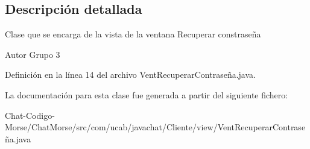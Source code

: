 \subsection{Descripción detallada}
Clase que se encarga de la vista de la ventana Recuperar constraseña \begin{DoxyAuthor}{Autor}
Grupo 3 
\end{DoxyAuthor}


Definición en la línea 14 del archivo Vent\-Recuperar\-Contraseña.\-java.



La documentación para esta clase fue generada a partir del siguiente fichero\-:\begin{DoxyCompactItemize}
\item 
Chat-\/\-Codigo-\/\-Morse/\-Chat\-Morse/src/com/ucab/javachat/\-Cliente/view/Vent\-Recuperar\-Contraseña.\-java\end{DoxyCompactItemize}
